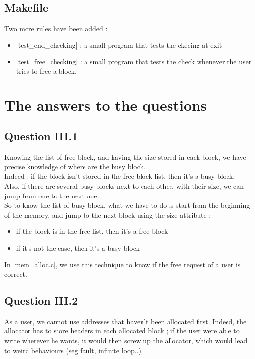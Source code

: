 \documentclass[twoside]{article}
\begin{document}
\subsection{Makefile}
Two more rules have been added :
\begin{itemize}
	\item |test_end_checking| : a small program that tests the ckecing at exit
	\item |test_free_checking| : a small program that tests the check whenever
		the user tries to free a block.
\end{itemize}

\section{The answers to the questions}
\subsection{Question III.1}
Knowing the list of free block, and having the size stored in each block,
we have precise knowledge of where are the busy block.\\

Indeed : if the block isn't stored in the free block list, then it's a busy
block. Also, if there are several busy blocks next to each other, with their
size, we can jump from one to the next one.\\

So to know the list of busy block, what we have to do is start from the
beginning of the memory, and jump to the next block using the size attribute :
\begin{itemize}
	\item if the block is in the free list, then it's a free block
	\item if it's not the case, then it's a busy block
\end{itemize}

In |mem_alloc.c|, we use this technique to know if the free request of a user
is correct.

\subsection{Question III.2}
As a user, we cannot use addresses that haven't been allocated first. Indeed,
the allocator has to store headers in each allocated block ; if the user were
able to write wherever he wants, it would then screw up the allocator, which
would lead to weird behaviours (seg fault, infinite loop..).\\
\end{document}
